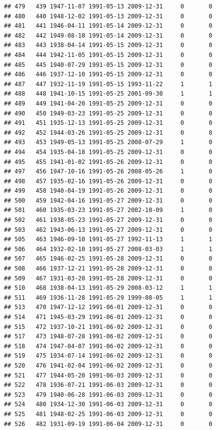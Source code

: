 \documentclass[
]{book}
\theoremstyle{definition}
\theoremstyle{definition}
\theoremstyle{definition}
\theoremstyle{definition}
\theoremstyle{remark}
\begin{document}
\begin{verbatim}
## 479   439 1947-11-07 1991-05-13 2009-12-31     0       0
## 480   440 1948-12-02 1991-05-13 2009-12-31     0       0
## 481   441 1946-04-11 1991-05-14 2009-12-31     0       0
## 482   442 1949-08-10 1991-05-14 2009-12-31     0       0
## 483   443 1938-04-14 1991-05-15 2009-12-31     0       0
## 484   444 1942-11-05 1991-05-15 2009-12-31     0       0
## 485   445 1940-07-29 1991-05-15 2009-12-31     0       0
## 486   446 1937-12-10 1991-05-15 2009-12-31     0       0
## 487   447 1932-11-19 1991-05-15 1993-11-22     1       1
## 488   448 1941-10-15 1991-05-25 2001-09-30     1       1
## 489   449 1941-04-20 1991-05-25 2009-12-31     0       0
## 490   450 1949-03-23 1991-05-25 2009-12-31     0       0
## 491   451 1935-12-13 1991-05-25 2009-12-31     0       0
## 492   452 1944-03-26 1991-05-25 2009-12-31     0       0
## 493   453 1949-05-13 1991-05-25 2008-07-29     1       0
## 494   454 1935-04-18 1991-05-25 2009-12-31     0       0
## 495   455 1941-01-02 1991-05-26 2009-12-31     0       0
## 497   456 1947-10-16 1991-05-26 2008-05-26     1       0
## 498   457 1935-02-16 1991-05-26 2009-12-31     0       0
## 499   458 1940-04-19 1991-05-26 2009-12-31     0       0
## 500   459 1942-04-16 1991-05-27 2009-12-31     0       0
## 501   460 1935-03-23 1991-05-27 2002-10-09     1       0
## 502   461 1938-05-23 1991-05-27 2009-12-31     0       0
## 503   462 1943-06-13 1991-05-27 2009-12-31     0       0
## 505   463 1946-09-10 1991-05-27 1992-11-13     1       1
## 506   464 1932-02-10 1991-05-27 2008-03-03     1       1
## 507   465 1946-02-25 1991-05-28 2009-12-31     0       0
## 508   466 1937-12-21 1991-05-28 2009-12-31     0       0
## 509   467 1931-03-20 1991-05-28 2009-12-31     0       0
## 510   468 1938-04-13 1991-05-29 2008-03-12     1       1
## 511   469 1936-11-28 1991-05-29 1999-08-05     1       1
## 513   470 1947-12-12 1991-06-01 2009-12-31     0       0
## 514   471 1945-03-29 1991-06-01 2009-12-31     0       0
## 515   472 1937-10-21 1991-06-02 2009-12-31     0       0
## 517   473 1948-07-28 1991-06-02 2009-12-31     0       0
## 518   474 1947-04-07 1991-06-02 2009-12-31     0       0
## 519   475 1934-07-14 1991-06-02 2009-12-31     0       0
## 520   476 1941-02-04 1991-06-02 2009-12-31     0       0
## 521   477 1944-05-20 1991-06-03 2009-12-31     0       0
## 522   478 1936-07-21 1991-06-03 2009-12-31     0       0
## 523   479 1940-06-28 1991-06-03 2009-12-31     0       0
## 524   480 1934-12-30 1991-06-03 2009-12-31     0       0
## 525   481 1948-02-25 1991-06-03 2009-12-31     0       0
## 526   482 1931-09-19 1991-06-04 2009-12-31     0       0

\end{verbatim}
\end{document}
